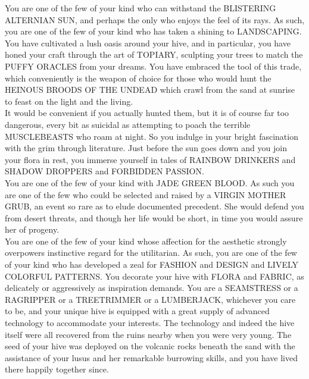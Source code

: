 \documentclass{42-en}
\begin{document}
    You are one of the few of your kind who can withstand the BLISTERING ALTERNIAN SUN,
    and perhaps the only who enjoys the feel of its rays.
    As such, you are one of the few of your kind who has taken a shining to LANDSCAPING.
    You have cultivated a lush oasis around your hive, and in particular,
    you have honed your craft through the art of TOPIARY,
    sculpting your trees to match the PUFFY ORACLES from your dreams.
    You have embraced the tool of this trade,
    which conveniently is the weapon of choice for those who would hunt the
    HEINOUS BROODS OF THE UNDEAD which crawl from the sand at sunrise to feast on the light and the living.\\

    It would be convenient if you actually hunted them,
    but it is of course far too dangerous,
    every bit as suicidal as attempting to poach the terrible MUSCLEBEASTS who roam at night.
    So you indulge in your bright fascination with the grim through literature.
    Just before the sun goes down and you join your flora in rest,
    you immerse yourself in tales of RAINBOW DRINKERS and SHADOW DROPPERS and FORBIDDEN PASSION.\\

    You are one of the few of your kind with JADE GREEN BLOOD.
    As such you are one of the few who could be selected and raised by a VIRGIN MOTHER GRUB,
    an event so rare as to elude documented precedent.
    She would defend you from desert threats,
    and though her life would be short,
    in time you would assure her of progeny.\\

    You are one of the few of your kind whose affection for the aesthetic strongly overpowers
    instinctive regard for the utilitarian.
    As such, you are one of the few of your kind who has developed a zeal for
    FASHION and DESIGN and LIVELY COLORFUL PATTERNS.
    You decorate your hive with FLORA and FABRIC, as delicately or aggressively as inspiration demands.
    You are a SEAMSTRESS or a RAGRIPPER or a TREETRIMMER or a LUMBERJACK, whichever you care to be,
    and your unique hive is equipped with a great supply of advanced technology to accommodate your interests.
    The technology and indeed the hive itself were all recovered from the ruins nearby when you were very young.
    The seed of your hive was deployed on the volcanic rocks beneath the sand with the assistance of your lusus
    and her remarkable burrowing skills, and you have lived there happily together since.\\
\end{document}
